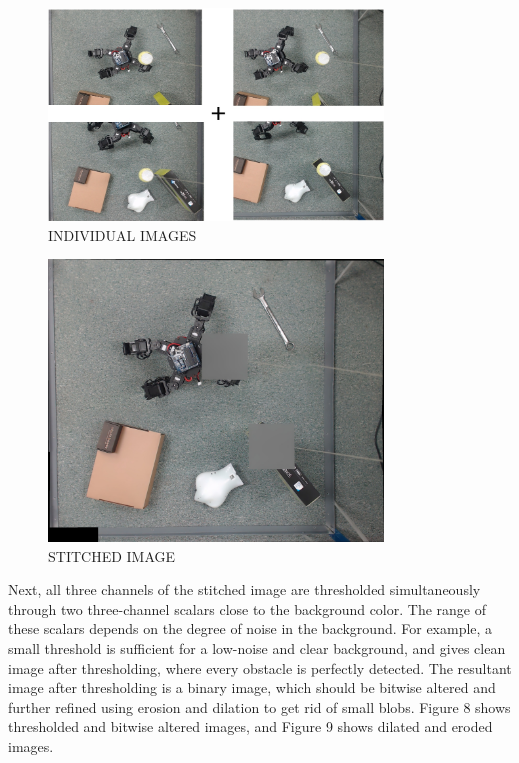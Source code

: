 \documentclass[twocolumn,10pt]{asme2e}
\begin{document}
\begin{figure}[t]
\begin{center}
\includegraphics[width=3.5in]{individual}
\caption{INDIVIDUAL IMAGES}
\label{default}
\end{center}
\end{figure}


\begin{figure}[t]
\begin{center}
\includegraphics[width=3.5in]{stitched}
\caption{STITCHED IMAGE}
\label{default}
\end{center}
\end{figure}

Next, all three channels of the stitched image are thresholded simultaneously through two three-channel scalars close to the background color. The range of these scalars depends on the degree of noise in the background. For example, a small threshold is sufficient for a low-noise and clear background, and gives clean image after thresholding, where every obstacle is perfectly detected. The resultant image after thresholding is a binary image, which should be bitwise altered and  further refined using erosion and dilation to get rid of small blobs. Figure 8 shows thresholded and bitwise altered images, and Figure 9 shows dilated and eroded images.
 
\end{document}
